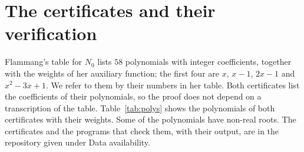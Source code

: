 \documentclass[11pt]{amsart}
\theoremstyle{remark}
\numberwithin{equation}{section}
\begin{document}
\section{The certificates and their verification}\label{sec:cert}

Flammang's table for $N_0$ \cite[Table~2]{Fla15} lists $58$ polynomials with integer coefficients, together with the weights of her auxiliary function; the first four are $x$, $x-1$, $2x-1$ and $x^2-3x+1$. We refer to them by their numbers in her table. Both certificates list the coefficients of their polynomials, so the proof does not depend on a transcription of the table. Table~\ref{tab:polys} shows the polynomials of both certificates with their weights. Some of the polynomials have non-real roots. The certificates and the programs that check them, with their output, are in the repository given under Data availability.
\end{document}
